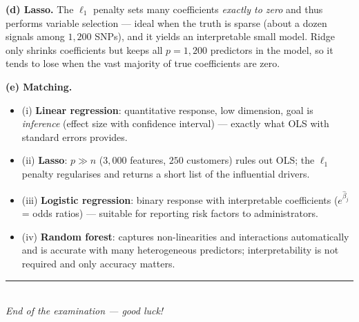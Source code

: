 \documentclass[11pt,a4paper]{article}
\begin{document}
\begin{solutionbox}
\medskip
\textbf{(d) Lasso.}
The $\ell_1$ penalty sets many coefficients \emph{exactly to zero} and thus performs variable
selection --- ideal when the truth is sparse (about a dozen signals among $1{,}200$ SNPs), and
it yields an interpretable small model. Ridge only shrinks coefficients but keeps all
$p=1{,}200$ predictors in the model, so it tends to lose when the vast majority of true
coefficients are zero.

\medskip
\textbf{(e) Matching.}
\begin{itemize}[nosep,leftmargin=5mm]
  \item (i) \textbf{Linear regression}: quantitative response, low dimension, goal is
    \emph{inference} (effect size with confidence interval) --- exactly what OLS with standard
    errors provides.
  \item (ii) \textbf{Lasso}: $p\gg n$ ($3{,}000$ features, $250$ customers) rules out OLS; the
    $\ell_1$ penalty regularises and returns a short list of the influential drivers.
  \item (iii) \textbf{Logistic regression}: binary response with interpretable coefficients
    ($e^{\hat\beta_j}$ = odds ratios) --- suitable for reporting risk factors to administrators.
  \item (iv) \textbf{Random forest}: captures non-linearities and interactions automatically
    and is accurate with many heterogeneous predictors; interpretability is not required and
    only accuracy matters.
\end{itemize}
\end{solutionbox}
\fi

\vspace{6mm}
\begin{center}
\rule{0.35\textwidth}{0.4pt}\\[1mm]
\textit{End of the examination --- good luck!}
\end{center}
\end{document}
